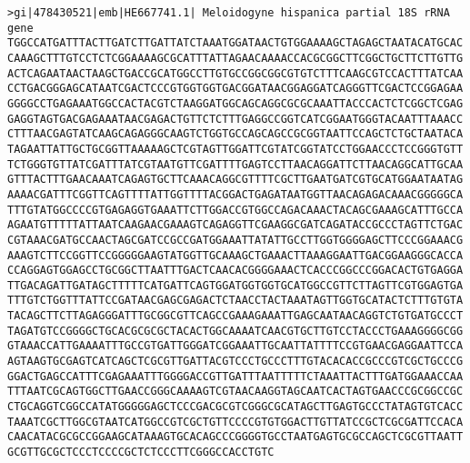 \documentclass[11pt]{article}
\begin{document}
\begin{Verbatim}[commandchars=\\\{\}]
>gi|478430521|emb|HE667741.1| Meloidogyne hispanica partial 18S rRNA gene
TGGCCATGATTTACTTGATCTTGATTATCTAAATGGATAACTGTGGAAAAGCTAGAGCTAATACATGCAC
CAAAGCTTTGTCCTCTCGGAAAAGCGCATTTATTAGAACAAAACCACGCGGCTTCGGCTGCTTCTTGTTG
ACTCAGAATAACTAAGCTGACCGCATGGCCTTGTGCCGGCGGCGTGTCTTTCAAGCGTCCACTTTATCAA
CCTGACGGGAGCATAATCGACTCCCGTGGTGGTGACGGATAACGGAGGATCAGGGTTCGACTCCGGAGAA
GGGGCCTGAGAAATGGCCACTACGTCTAAGGATGGCAGCAGGCGCGCAAATTACCCACTCTCGGCTCGAG
GAGGTAGTGACGAGAAATAACGAGACTGTTCTCTTTGAGGCCGGTCATCGGAATGGGTACAATTTAAACC
CTTTAACGAGTATCAAGCAGAGGGCAAGTCTGGTGCCAGCAGCCGCGGTAATTCCAGCTCTGCTAATACA
TAGAATTATTGCTGCGGTTAAAAAGCTCGTAGTTGGATTCGTATCGGTATCCTGGAACCCTCCGGGTGTT
TCTGGGTGTTATCGATTTATCGTAATGTTCGATTTTGAGTCCTTAACAGGATTCTTAACAGGCATTGCAA
GTTTACTTTGAACAAATCAGAGTGCTTCAAACAGGCGTTTTCGCTTGAATGATCGTGCATGGAATAATAG
AAAACGATTTCGGTTCAGTTTTATTGGTTTTACGGACTGAGATAATGGTTAACAGAGACAAACGGGGGCA
TTTGTATGGCCCCGTGAGAGGTGAAATTCTTGGACCGTGGCCAGACAAACTACAGCGAAAGCATTTGCCA
AGAATGTTTTTATTAATCAAGAACGAAAGTCAGAGGTTCGAAGGCGATCAGATACCGCCCTAGTTCTGAC
CGTAAACGATGCCAACTAGCGATCCGCCGATGGAAATTATATTGCCTTGGTGGGGAGCTTCCCGGAAACG
AAAGTCTTCCGGTTCCGGGGGAAGTATGGTTGCAAAGCTGAAACTTAAAGGAATTGACGGAAGGGCACCA
CCAGGAGTGGAGCCTGCGGCTTAATTTGACTCAACACGGGGAAACTCACCCGGCCCGGACACTGTGAGGA
TTGACAGATTGATAGCTTTTTCATGATTCAGTGGATGGTGGTGCATGGCCGTTCTTAGTTCGTGGAGTGA
TTTGTCTGGTTTATTCCGATAACGAGCGAGACTCTAACCTACTAAATAGTTGGTGCATACTCTTTGTGTA
TACAGCTTCTTAGAGGGATTTGCGGCGTTCAGCCGAAAGAAATTGAGCAATAACAGGTCTGTGATGCCCT
TAGATGTCCGGGGCTGCACGCGCGCTACACTGGCAAAATCAACGTGCTTGTCCTACCCTGAAAGGGGCGG
GTAAACCATTGAAAATTTGCCGTGATTGGGATCGGAAATTGCAATTATTTTCCGTGAACGAGGAATTCCA
AGTAAGTGCGAGTCATCAGCTCGCGTTGATTACGTCCCTGCCCTTTGTACACACCGCCCGTCGCTGCCCG
GGACTGAGCCATTTCGAGAAATTTGGGGACCGTTGATTTAATTTTTCTAAATTACTTTGATGGAAACCAA
TTTAATCGCAGTGGCTTGAACCGGGCAAAAGTCGTAACAAGGTAGCAATCACTAGTGAACCCGCGGCCGC
CTGCAGGTCGGCCATATGGGGGAGCTCCCGACGCGTCGGGCGCATAGCTTGAGTGCCCTATAGTGTCACC
TAAATCGCTTGGCGTAATCATGGCCGTCGCTGTTCCCCGTGTGGACTTGTTATCCGCTCGCGATTCCACA
CAACATACGCGCCGGAAGCATAAAGTGCACAGCCCGGGGTGCCTAATGAGTGCGCCAGCTCGCGTTAATT
GCGTTGCGCTCCCTCCCCGCTCTCCCTTCGGGCCACCTGTC


\end{Verbatim}
\end{document}
